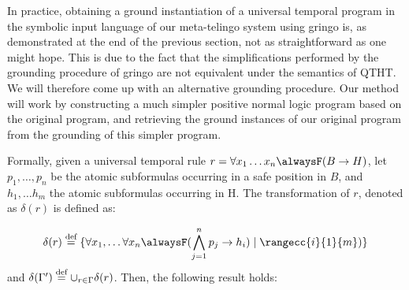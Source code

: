 In practice, obtaining a ground instantiation of a universal temporal
program in the symbolic input language of our meta-telingo system
using gringo is, as demonstrated at the end of the previous section,
not as straightforward as one might hope. This is due to the fact that
the simplifications performed by the grounding procedure of gringo are
not equivalent under the semantics of QTHT. We will therefore come up
with an alternative grounding procedure. Our method will work by
constructing a much simpler positive normal logic program based on the
original program, and retrieving the ground instances of our original
program from the grounding of this simpler program.



Formally, given a universal temporal rule
$r=\forall x_1 \dots x_n \alwaysF(B \rightarrow H)$, let
$p_1,\dots, p_n$ be the atomic subformulas occurring in a safe
position in $B$, and $h_1, \dots h_m$ the atomic subformulas occurring
in H. The transformation of $r$, denoted as $\delta(r)$ is defined as:

\begin{equation*} \delta(r) \defeq \{ \forall x_1, \dots \forall x_n
\alwaysF(\bigwedge_{j=1}^{n}p_j \rightarrow h_i) \mid
\rangecc{i}{1}{m})\}
\end{equation*}
and $\delta (\Gamma^{\prime}) \stackrel{\text{def}}{=} \cup_{r \in \Gamma}
\delta(r)$. Then, the following result holds:

